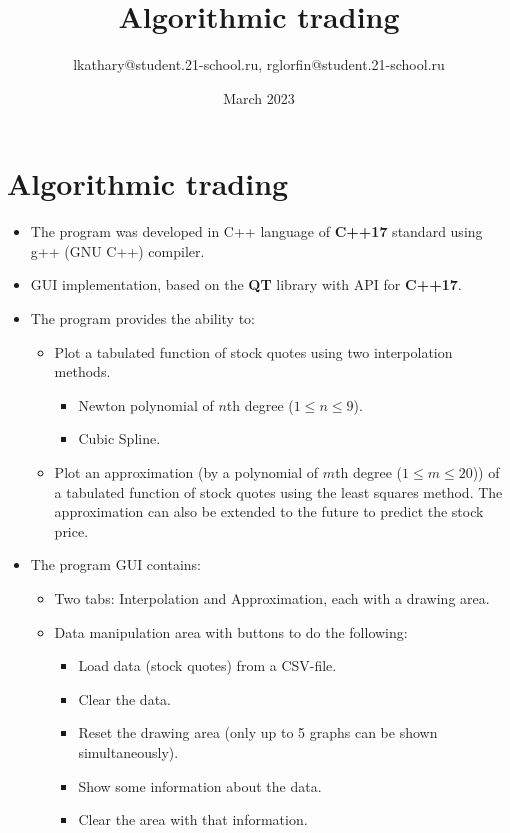\documentclass{article}
\title{Algorithmic trading}
\author{lkathary@student.21-school.ru, rglorfin@student.21-school.ru}
\date{March 2023}
\begin{document}
\maketitle

\section{Algorithmic trading}
\begin{itemize}
    \item The program was developed in C++ language of \textbf{C++17} standard using g++ (GNU C++) compiler.
    \item GUI implementation, based on the \textbf{QT} library with API for \textbf{C++17}.
    \item The program provides the ability to:
        \begin{itemize}
            \item Plot a tabulated function of stock quotes using two interpolation methods.
            \begin{itemize}
            \item Newton polynomial of \(n\)th degree (\(1 \leq n \leq 9\)).
            \item Cubic Spline.
        \end{itemize}
    \item Plot an approximation (by a polynomial of \(m\)th degree (\(1 \leq m \leq 20\)))
           of a tabulated function of stock quotes using the least squares method.
           The approximation can also be extended to the future to predict the stock price.
    \end{itemize}
\end{itemize}

\begin{itemize}
    \item The program GUI contains:
    \begin{itemize}
        \item Two tabs: Interpolation and Approximation, each with a drawing area.
        \item Data manipulation area with buttons to do the following:
            \begin{itemize}
                \item Load data (stock quotes) from a CSV-file.
                \item Clear the data.
                \item Reset the drawing area (only up to 5 graphs can be shown simultaneously).
                \item Show some information about the data.
                \item Clear the area with that information.
            \end{itemize}
    \end{itemize}
\end{itemize}
\end{document}
